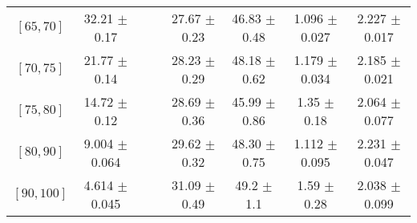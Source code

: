 \begin{tabular}{c||c|c|c|c|c|c|c}
$[65, 70]$ & 32.21 $\pm$ 0.17 &  &  & 27.67 $\pm$ 0.23 & 46.83 $\pm$ 0.48 & 1.096 $\pm$ 0.027 & 2.227 $\pm$ 0.017\\
$[70, 75]$ & 21.77 $\pm$ 0.14 &  &  & 28.23 $\pm$ 0.29 & 48.18 $\pm$ 0.62 & 1.179 $\pm$ 0.034 & 2.185 $\pm$ 0.021\\
$[75, 80]$ & 14.72 $\pm$ 0.12 &  &  & 28.69 $\pm$ 0.36 & 45.99 $\pm$ 0.86 & 1.35 $\pm$ 0.18 & 2.064 $\pm$ 0.077\\
$[80, 90]$ & 9.004 $\pm$ 0.064 &  &  & 29.62 $\pm$ 0.32 & 48.30 $\pm$ 0.75 & 1.112 $\pm$ 0.095 & 2.231 $\pm$ 0.047\\
$[90, 100]$ & 4.614 $\pm$ 0.045 &  &  & 31.09 $\pm$ 0.49 & 49.2 $\pm$ 1.1 & 1.59 $\pm$ 0.28 & 2.038 $\pm$ 0.099\\
\end{tabular}
